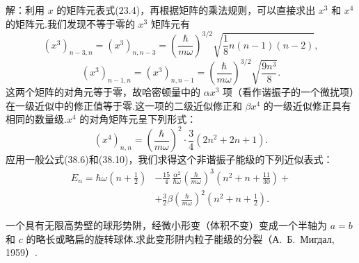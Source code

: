 \begin{xiti}
解：利用 $x$ 的矩阵元表式(23.4)，再根据矩阵的乘法规则，可以直接求出 $x^3$ 和 $x^4$ 的矩阵元.我们发现不等于零的 $x^3$ 矩阵元有
\begin{equation*}
  \left(x^3\right)_{n-3,n}=\left(x^3\right)_{n,n-3}
  =\left(\frac{\hbar}{m\omega}\right)^{3/2}\sqrt{\frac{1}{8}n(n-1)(n-2)},
\end{equation*}
\begin{equation*}
  \left(x^3\right)_{n-1,n}=\left(x^3\right)_{n,n-1}
  =\left(\frac{\hbar}{m\omega}\right)^{3/2}\sqrt{\frac{9n^3}{8}}.
\end{equation*}
这两个矩阵的对角元等于零，故哈密顿量中的 $\alpha x^3$ 项（看作谐振子的一个微扰项）在一级近似中的修正值等于零.这一项的二级近似修正和 $\beta x^4$ 的一级近似修正具有相同的数量级.$x^4$ 的对角矩阵元呈下列形式：
\begin{equation*}
  \left(x^4\right)_{n,n}=\left(\frac{\hbar}{m\omega}\right)^2\cdot\frac{3}{4}\left(2n^2+2n+1\right).
\end{equation*}
应用一般公式(38.6)和(38.10)，我们求得这个非谐振子能级的下列近似表式：
\begin{equation*}
\begin{aligned}
  E_n=\hbar\omega\left(n+\frac{1}{2}\right)
  &-\frac{15}{4}\,\frac{\alpha^2}{\hbar\omega}\left(\frac{\hbar}{m\omega}\right)^3
  \left(n^2+n+\frac{11}{30}\right)+\\
  &+\frac{3}{2}\beta\left(\frac{\hbar}{m\omega}\right)^2\left(n^2+n+\frac{1}{2}\right).
\end{aligned}
\end{equation*}

\quad 一个具有无限高势壁的球形势阱，经微小形变（体积不变）变成一个半轴为 $a=b$ 和 $c$ 的略长或略扁的旋转球体.求此变形阱内粒子能级的分裂（А.~Б.~Мигдал, 1959）.


\end{xiti}
